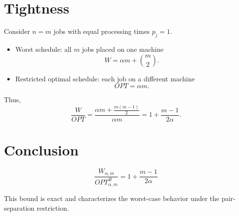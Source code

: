\documentclass[11pt]{article}
\begin{document}
\section{Tightness}

Consider $n=m$ jobs with equal processing times $p_j = 1$.

\begin{itemize}
\item Worst schedule: all $m$ jobs placed on one machine
\[
W = \alpha m + \binom{m}{2}.
\]

\item Restricted optimal schedule: each job on a different machine
\[
OPT = \alpha m.
\]
\end{itemize}

Thus,
\[
\frac{W}{OPT}
=
\frac{\alpha m + \frac{m(m-1)}{2}}{\alpha m}
=
1 + \frac{m-1}{2\alpha}.
\]

\section{Conclusion}

\[
\boxed{
\frac{W_{\alpha,m}}{OPT_{\alpha,m}^R}
=
1 + \frac{m-1}{2\alpha}
}
\]

This bound is exact and characterizes the worst-case behavior under the pair-separation restriction.
\end{document}
